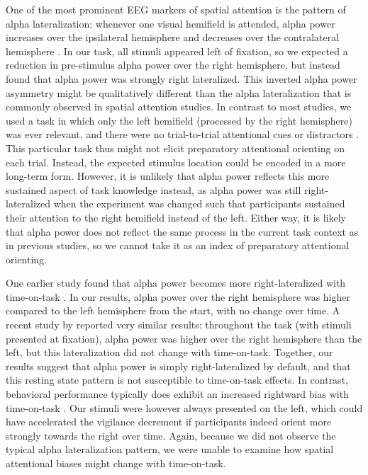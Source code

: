 \documentclass[11pt,]{memoir}
\begin{document}
One of the most prominent EEG markers of spatial attention is the pattern of alpha lateralization: whenever one visual hemifield is attended, alpha power increases over the ipsilateral hemisphere and decreases over the contralateral hemisphere \autocite{Klimesch2012}. In our task, all stimuli appeared left of fixation, so we expected a reduction in pre-stimulus alpha power over the right hemisphere, but instead found that alpha power was strongly right lateralized. This inverted alpha power asymmetry might be qualitatively different than the alpha lateralization that is commonly observed in spatial attention studies. In contrast to most studies, we used a task in which only the left hemifield (processed by the right hemisphere) was ever relevant, and there were no trial-to-trial attentional cues or distractors \autocites{Rihs2009}{Slagter2016}. This particular task thus might not elicit preparatory attentional orienting on each trial. Instead, the expected stimulus location could be encoded in a more long-term form. However, it is unlikely that alpha power reflects this more sustained aspect of task knowledge instead, as alpha power was still right-lateralized when the experiment was changed such that participants sustained their attention to the right hemifield \autocite{Slagter2016} instead of the left. Either way, it is likely that alpha power does not reflect the same process in the current task context as in previous studies, so we cannot take it as an index of preparatory attentional orienting.

One earlier study found that alpha power becomes more right-lateralized with time-on-task \autocite{Newman2013}. In our results, alpha power over the right hemisphere was higher compared to the left hemisphere from the start, with no change over time. A recent study by \textcite{Benwell2018} reported very similar results: throughout the task (with stimuli presented at fixation), alpha power was higher over the right hemisphere than the left, but this lateralization did not change with time-on-task. Together, our results suggest that alpha power is simply right-lateralized by default, and that this resting state pattern is not susceptible to time-on-task effects. In contrast, behavioral performance typically does exhibit an increased rightward bias with time-on-task \autocites{Benwell2013}{Dufour2007}{Manly2005}. Our stimuli were however always presented on the left, which could have accelerated the vigilance decrement if participants indeed orient more strongly towards the right over time. Again, because we did not observe the typical alpha lateralization pattern, we were unable to examine how spatial attentional biases might change with time-on-task.
\end{document}
